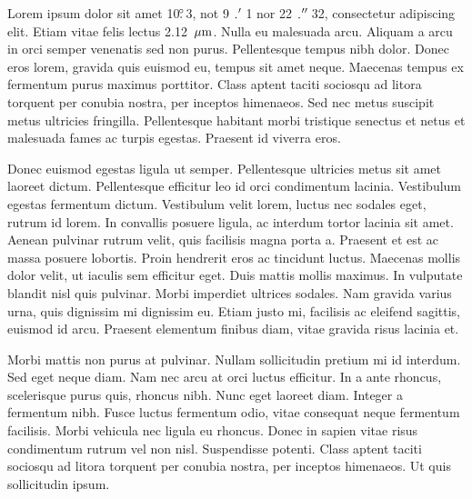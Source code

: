 \documentclass{lowell-prop}
\begin{document}


\scienceJustification


Lorem ipsum dolor sit amet 10$\mbox{$.\!\!^\circ$}$3, not 9$\farcm$1 nor 22$\farcs$32,
consectetur adipiscing elit. Etiam vitae felis lectus
2.12~$\mbox{$\mu$m}$. Nulla eu malesuada arcu. Aliquam a arcu in orci semper
venenatis sed non purus. Pellentesque tempus nibh dolor. Donec eros
lorem, gravida quis euismod eu, tempus sit amet neque. Maecenas tempus
ex fermentum purus maximus porttitor. Class aptent taciti sociosqu ad
litora torquent per conubia nostra, per inceptos himenaeos. Sed nec
metus suscipit metus ultricies fringilla. Pellentesque habitant morbi
tristique senectus et netus et malesuada fames ac turpis
egestas. Praesent id viverra eros.

Donec euismod egestas ligula ut semper. Pellentesque ultricies metus
sit amet laoreet dictum. Pellentesque efficitur leo id orci
condimentum lacinia. Vestibulum egestas fermentum dictum. Vestibulum
velit lorem, luctus nec sodales eget, rutrum id lorem. In convallis
posuere ligula, ac interdum tortor lacinia sit amet. Aenean pulvinar
rutrum velit, quis facilisis magna porta a. Praesent et est ac massa
posuere lobortis. Proin hendrerit eros ac tincidunt luctus. Maecenas
mollis dolor velit, ut iaculis sem efficitur eget. Duis mattis mollis
maximus. In vulputate blandit nisl quis pulvinar. Morbi imperdiet
ultrices sodales. Nam gravida varius urna, quis dignissim mi dignissim
eu. Etiam justo mi, facilisis ac eleifend sagittis, euismod id
arcu. Praesent elementum finibus diam, vitae gravida risus lacinia et.

Morbi mattis non purus at pulvinar. Nullam sollicitudin pretium mi id
interdum. Sed eget neque diam. Nam nec arcu at orci luctus
efficitur. In a ante rhoncus, scelerisque purus quis, rhoncus
nibh. Nunc eget laoreet diam. Integer a fermentum nibh. Fusce luctus
fermentum odio, vitae consequat neque fermentum facilisis. Morbi
vehicula nec ligula eu rhoncus. Donec in sapien vitae risus
condimentum rutrum vel non nisl. Suspendisse potenti. Class aptent
taciti sociosqu ad litora torquent per conubia nostra, per inceptos
himenaeos. Ut quis sollicitudin ipsum.
\end{document}
